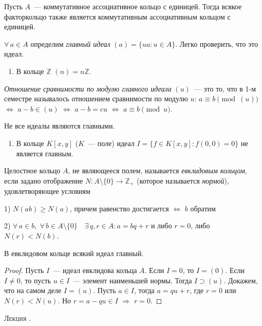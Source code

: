 \documentclass[a4paper]{article}
\newcounter{lec}
\renewcommand{\thelec}{\Roman{lec}}
\newcommand*{\lecture}[1]{\refstepcounter{lec}\vspace{20pt}
\begin{center}{\rmfamily\textsc{Лекция \thelec. \\ \textbf{#1}}}\vspace{5pt}
\end{center}}
\begin{document}
Пусть $A$~--- коммутативное ассоциативное кольцо с единицей. Тогда
всякое факторкольцо также является коммутативным ассоциативным
кольцом с единицей.

$\forall \, a\in A$ определим \emph{главный идеал} $(a)=\{ua: u\in
A\}$. Легко проверить, что это идеал.

\begin{ex}
\begin{enumerate}
  \item В кольце $\mathbb{Z}$ $(n)=n\mathbb{Z}$.
\end{enumerate}
\end{ex}

\emph{Отношение сравнимости по модулю главного идеала} $(u)$~--- это
то, что в 1-м семестре называлось отношением сравнимости по модулю
$u$: $a\equiv b\pmod{(u)}$ $\Leftrightarrow$ $a-b\in(u)$
$\Leftrightarrow$ $a-b=cu$ $\Leftrightarrow$ $a\equiv b\pmod{u}$.

Не все идеалы являются главными.

\begin{ex}
\begin{enumerate}
  \item В кольце $K[x,y]$ ($K$~--- поле) идеал $I=\{f\in K[x,y]:
  f(0,0)=0\}$ не является главным.
\end{enumerate}
\end{ex}

Целостное кольцо $A$, не являющееся полем, называется
\emph{евклидовым кольцом}, если задано отображение $N\colon
A\setminus \{0\}\to \mathbb{Z}_+$ (которое называется
\emph{нормой}), удовлетворяющее условиям

1) $N(ab)\geqslant N(a)$, причем равенство достигается
$\Leftrightarrow$ $b$ обратим

2) $\forall \, a\in b,\; \forall \, b\in A\setminus \{0\}\quad
\exists \, q,r\in A: a=bq+r$ и либо $r=0$, либо $N(r)<N(b)$.

\begin{theorem}
В евклидовом кольце всякий идеал главный.
\end{theorem}

\begin{proof}
Пусть $I$~--- идеал евклидова кольца $A$. Если $I=0$, то $I=(0)$.
Если $I\neq 0$, то пусть $u\in I$~--- элемент наименьшей нормы.
Тогда $I\supset (u)$. Докажем, что на самом деле $I=(u)$. Пусть
$a\in I$, тогда $a=qu+r$, где $r=0$ или $N(r)<N(u)$. Но $r=a-qu\in
I$ $\Rightarrow$ $r=0$.
\end{proof}
\lecture{}
\end{document}

